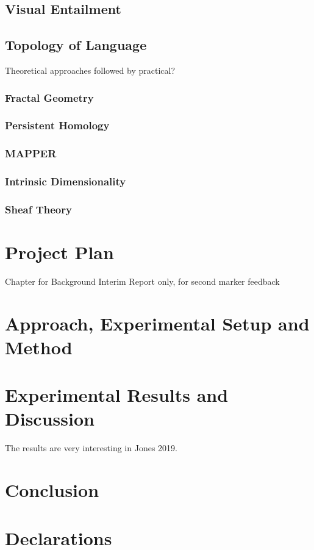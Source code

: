 \documentclass[12pt,twoside]{report}
\begin{document}
\section{Visual Entailment}
\section{Topology of Language}
Theoretical approaches followed by  practical?
\subsection{Fractal Geometry}
\subsection{Persistent Homology}
\subsection{MAPPER}
\subsection{Intrinsic Dimensionality}
\subsection{Sheaf Theory}


\chapter{Project Plan}
Chapter for Background Interim Report only, for second marker feedback



\chapter{Approach, 
Experimental Setup and Method}


\chapter{Experimental Results and Discussion}
The results are very interesting in Jones 2019.

\chapter{Conclusion}





\chapter*{Declarations}
\end{document}
